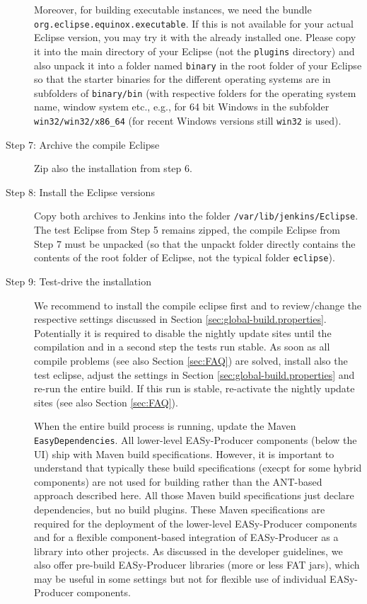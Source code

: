 \begin{description}
Moreover, for building executable instances, we need the bundle\\
\texttt{org.eclipse.equinox.executable}. If this is not available for your actual Eclipse version, you may try it with the already installed one. Please copy it into the main directory of your Eclipse (not the \texttt{plugins} directory) and also unpack it into a folder named \texttt{binary} in the root folder of your Eclipse so that the starter binaries for the different operating systems are in subfolders of \texttt{binary/bin} (with respective folders for the operating system name, window system etc., e.g., for 64 bit Windows in the subfolder \texttt{win32/win32/x86\_64} (for recent Windows versions still \texttt{win32} is used).

	\item[Step 7: Archive the compile Eclipse] $ $\\

Zip also the installation from step 6.	

	\item[Step 8: Install the Eclipse versions] $ $\\

Copy both archives to Jenkins into the folder \texttt{/var/lib/jenkins/Eclipse}. The test Eclipse from Step 5 remains zipped, the compile Eclipse from Step 7 must be unpacked (so that the unpackt folder directly contains the contents of the root folder of Eclipse, not the typical folder \texttt{eclipse}). 

	\item[Step 9: Test-drive the installation] $ $\\

We recommend to install the compile eclipse first and to review/change the respective settings discussed in Section \vref{sec:global-build.properties}. Potentially it is required to disable the nightly update sites until the compilation and in a second step the tests run stable. As soon as all compile problems (see also Section \vref{sec:FAQ}) are solved, install also the test eclipse, adjust the settings in Section \vref{sec:global-build.properties} and re-run the entire build. If this run is stable, re-activate the nightly update sites (see also Section \vref{sec:FAQ}). 

When the entire build process is running, update the Maven \texttt{EasyDependencies}. All lower-level EASy-Producer components (below the UI) ship with Maven build specifications. However, it is important to understand that typically these build specifications (execpt for some hybrid components) are not used for building rather than the ANT-based approach described here. All those Maven build specifications just declare dependencies, but no build plugins. These Maven specifications are required for the deployment of the lower-level EASy-Producer components and for a flexible component-based integration of EASy-Producer as a library into other projects. As discussed in the developer guidelines, we also offer pre-build EASy-Producer libraries (more or less FAT jars), which may be useful in some settings but not for flexible use of individual EASy-Producer components. 


\end{description}
